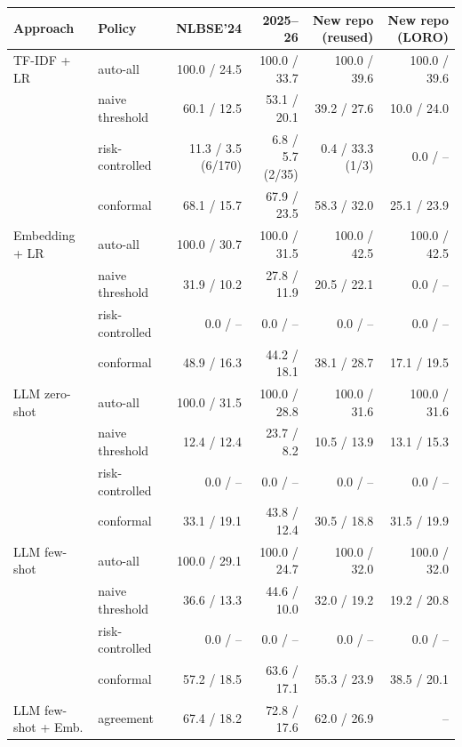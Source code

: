 \begin{tabular}{llrrrr}
\toprule
Approach & Policy & NLBSE'24 & 2025--26 & New repo (reused) & New repo (LORO) \\
\midrule
TF-IDF + LR & auto-all & 100.0 / 24.5 & 100.0 / 33.7 & 100.0 / 39.6 & 100.0 / 39.6 \\
 & naive threshold & 60.1 / 12.5 & 53.1 / 20.1 & 39.2 / 27.6 & 10.0 / 24.0 \\
 & risk-controlled & 11.3 / 3.5 \scriptsize(6/170) & 6.8 / 5.7 \scriptsize(2/35) & 0.4 / 33.3 \scriptsize(1/3) & 0.0 / -- \\
 & conformal & 68.1 / 15.7 & 67.9 / 23.5 & 58.3 / 32.0 & 25.1 / 23.9 \\
\midrule
Embedding + LR & auto-all & 100.0 / 30.7 & 100.0 / 31.5 & 100.0 / 42.5 & 100.0 / 42.5 \\
 & naive threshold & 31.9 / 10.2 & 27.8 / 11.9 & 20.5 / 22.1 & 0.0 / -- \\
 & risk-controlled & 0.0 / -- & 0.0 / -- & 0.0 / -- & 0.0 / -- \\
 & conformal & 48.9 / 16.3 & 44.2 / 18.1 & 38.1 / 28.7 & 17.1 / 19.5 \\
\midrule
LLM zero-shot & auto-all & 100.0 / 31.5 & 100.0 / 28.8 & 100.0 / 31.6 & 100.0 / 31.6 \\
 & naive threshold & 12.4 / 12.4 & 23.7 / 8.2 & 10.5 / 13.9 & 13.1 / 15.3 \\
 & risk-controlled & 0.0 / -- & 0.0 / -- & 0.0 / -- & 0.0 / -- \\
 & conformal & 33.1 / 19.1 & 43.8 / 12.4 & 30.5 / 18.8 & 31.5 / 19.9 \\
\midrule
LLM few-shot & auto-all & 100.0 / 29.1 & 100.0 / 24.7 & 100.0 / 32.0 & 100.0 / 32.0 \\
 & naive threshold & 36.6 / 13.3 & 44.6 / 10.0 & 32.0 / 19.2 & 19.2 / 20.8 \\
 & risk-controlled & 0.0 / -- & 0.0 / -- & 0.0 / -- & 0.0 / -- \\
 & conformal & 57.2 / 18.5 & 63.6 / 17.1 & 55.3 / 23.9 & 38.5 / 20.1 \\
\midrule
LLM few-shot + Emb. & agreement & 67.4 / 18.2 & 72.8 / 17.6 & 62.0 / 26.9 & -- \\
\bottomrule
\end{tabular}
